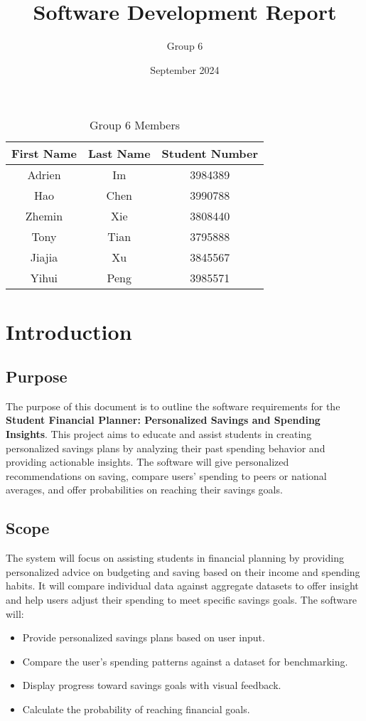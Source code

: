 \documentclass{article}
\title{Software Development Report}
\author{Group 6}
\date{September 2024}
\begin{document}
\maketitle

\begin{table}[ht]
    \centering
    \begin{tabular}{ccc} 
    \toprule
    \textbf{First Name} & \textbf{Last Name} & \textbf{Student Number} \\ 
    \midrule
    Adrien & Im       & 3984389 \\ 
    Hao    & Chen     & 3990788 \\ 
    Zhemin & Xie      & 3808440 \\ 
    Tony   & Tian     & 3795888 \\ 
    Jiajia & Xu       & 3845567 \\ 
    Yihui  & Peng     & 3985571 \\ 
    \bottomrule
    \end{tabular}
    \caption{Group 6 Members}
    \label{tab:group6_members}
\end{table}

\section{Introduction}
\subsection{Purpose}
The purpose of this document is to outline the software requirements for the \textbf{Student Financial Planner: Personalized Savings and Spending Insights}. This project aims to educate and assist students in creating personalized savings plans by analyzing their past spending behavior and providing actionable insights. The software will give personalized recommendations on saving, compare users' spending to peers or national averages, and offer probabilities on reaching their savings goals.

\subsection{Scope}
The system will focus on assisting students in financial planning by providing personalized advice on budgeting and saving based on their income and spending habits. It will compare individual data against aggregate datasets to offer insight and help users adjust their spending to meet specific savings goals. The software will:
\begin{itemize}
    \item Provide personalized savings plans based on user input.
    \item Compare the user's spending patterns against a dataset for benchmarking.
    \item Display progress toward savings goals with visual feedback.
    \item Calculate the probability of reaching financial goals.
\end{itemize}
\end{document}
